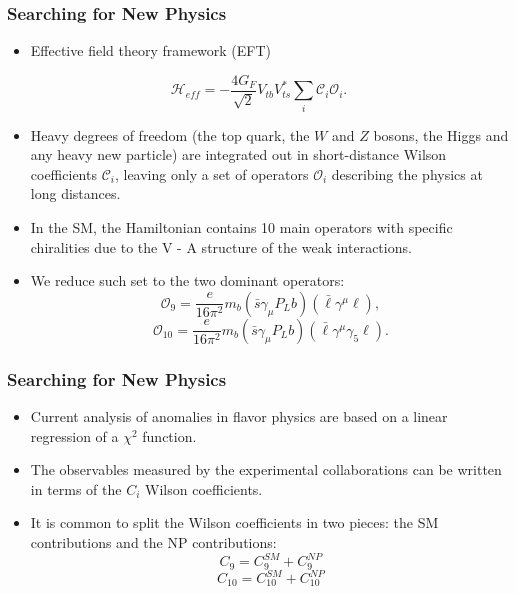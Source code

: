 \documentclass{beamer}
\begin{document}
\begin{frame}
\frametitle{Searching for New Physics}
\begin{itemize}
	\item Effective field theory framework (EFT)
\end{itemize}

\[
\mathcal{H}_{eff} = -\frac{4G_F}{\sqrt{2}}V_{tb}V^*_{ts}\sum_{i}\mathcal{C}_i\mathcal{O}_i.
\]

 \begin{itemize}
 	\item  Heavy degrees of freedom (the top quark, the \(W\) and \(Z\) bosons, the Higgs and any heavy new particle) are integrated out in short-distance Wilson coefficients \( \mathcal{C}_i \), leaving only a set of operators \(\mathcal{O}_i \) describing the physics at long distances.
 	\item In the SM, the Hamiltonian contains 10 main operators with specific chiralities due to the V - A structure
 	of the weak interactions.
 	\item We reduce such set to the two dominant operators:
 	\[
 	\mathcal{O}_9 = \frac{e}{16\pi^2}m_b(\bar{s}\gamma_{\mu}P_Lb)(\bar{\ell}\gamma^{\mu}\ell),
 	\]
 	\[
 	\mathcal{O}_{10} = \frac{e}{16\pi^2}m_b(\bar{s}\gamma_{\mu}P_Lb)(\bar{\ell}\gamma^{\mu}\gamma_{5}\ell).
 	\]

 \end{itemize}



\end{frame}

\begin{frame}
\frametitle{Searching for New Physics}
\begin{itemize}
	\item Current analysis of anomalies in 
flavor physics are based on a linear regression of a \(\chi^2 \) function.
	\item The observables measured by the experimental collaborations can be written in
	terms of the \(C_i \)  Wilson coefficients.
	\item It is common to split the Wilson coefficients
	in two pieces: the SM contributions and the NP contributions:
	\[
	C_9 = C^{SM}_9 + C^{NP}_9
	\]
	\[
	C_{10} = C^{SM}_{10} + C^{NP}_{10}
	\]
\end{itemize}
 


\end{frame}
\end{document}
